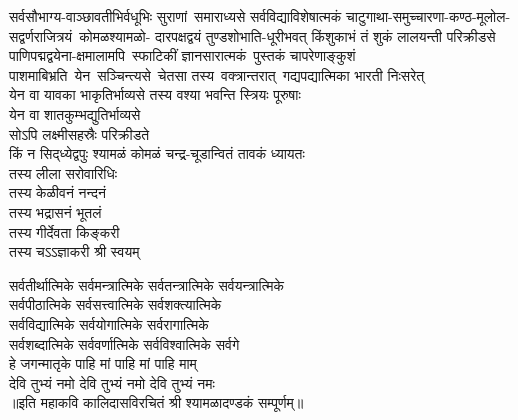 \begin{multicols}{2}
\begin{flushleft}
\medskip
सर्वसौभाग्य-वाञ्छावतीभिर्वधूभिः
सुराणां~समाराध्यसे सर्वविद्याविशेषात्मकं
चाटुगाथा-समुच्चारणा-कण्ठ-मूलोल-
सद्वर्णराजित्रयं~कोमळश्यामळो-
दारपक्षद्वयं तुण्डशोभाति-धूरीभवत् 
किंशुकाभं तं शुकं लालयन्ती परिक्रीडसे\\
\medskip
\mbox{पाणिपद्मद्वयेना-क्षमालामपि~स्फाटिकीं}
ज्ञानसारात्मकं~पुस्तकं चापरेणाङ्कुशं
पाशमाबिभ्रति~येन~सञ्चिन्त्यसे~चेतसा 
तस्य~वक्त्रान्तरात्~गद्यपद्यात्मिका
भारती निःसरेत्\\
\medskip
येन वा यावका भाकृतिर्भाव्यसे
तस्य  वश्या भवन्ति स्त्रियः पूरुषाः\\
येन वा शातकुम्भद्युतिर्भाव्यसे\\
सोऽपि लक्ष्मीसहस्रैः परिक्रीडते\\
\medskip
किं न सिद्‌ध्येद्वपुः श्यामळं कोमळं 
चन्द्र-चूडान्वितं तावकं ध्यायतः\\
तस्य लीला सरोवारिधिः\\
तस्य केळीवनं नन्दनं\\
तस्य भद्रासनं भूतलं\\
तस्य गीर्देवता किङ्करी\\
तस्य चऽऽज्ञाकरी श्री स्वयम्\\
\end{flushleft}
\end{multicols}
\begin{center}
सर्वतीर्थात्मिके सर्वमन्त्रात्मिके सर्वतन्त्रात्मिके सर्वयन्त्रात्मिके\\
सर्वपीठात्मिके सर्वसत्त्वात्मिके सर्वशक्त्यात्मिके\\
सर्वविद्यात्मिके सर्वयोगात्मिके सर्वरागात्मिके\\
सर्वशब्दात्मिके सर्ववर्णात्मिके सर्वविश्वात्मिके सर्वगे\\
हे जगन्मातृके पाहि मां पाहि मां पाहि माम् \\
देवि तुभ्यं नमो देवि तुभ्यं नमो देवि तुभ्यं नमः\\
॥इति महाकवि कालिदासविरचितं श्री श्यामळादण्डकं सम्पूर्णम्॥
\end{center}